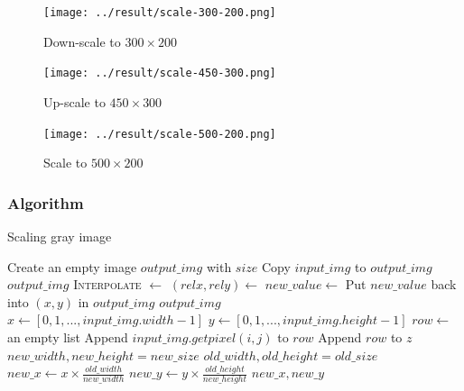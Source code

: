 \documentclass{article}
\begin{document}
\begin{figure}[H]
\centering
\texttt{[image: ../result/scale-300-200.png]}
\caption{Down-scale to $300 \times 200$}
\label{scale300}
\end{figure}

\begin{figure}[H]
\centering
\texttt{[image: ../result/scale-450-300.png]}
\caption{Up-scale to $450 \times 300$}
\label{scale450}
\end{figure}

\begin{figure}[H]
\centering
\texttt{[image: ../result/scale-500-200.png]}
\caption{Scale to $500 \times 200$}
\label{scale500}
\end{figure}

\subsubsection{Algorithm}
\label{sec:scalealgo}
\begin{algorithm}[H]
\centering
\caption{Scaling gray image}
\label{alg:scale}
  \begin{algorithmic}[1]
      \State Create an empty image $output\_img$ with $size$
        \State Copy $input\_img$ to $output\_img$
        \State \Return $output\_img$
	  \EndIf
      \State \textsc{Interpolate} $\gets$ 
      	\State $(relx, rely) \gets$ 
      	\State $new\_value \gets$ 
      	\State Put $new\_value$ back into $(x, y)$ in $output\_img$
      \EndFor
      \State \Return $output\_img$
    \EndFunction
    \\
      \State $x \gets [0, 1, ..., input\_img.width - 1]$
      \State $y \gets [0, 1, ..., input\_img.height - 1]$
      	  \State $row \gets$ an empty list
      	  \State Append $input\_img.getpixel(i, j)$ to $row$
      	\EndFor
      	\State Append $row$ to $z$
      \EndFor
      \State \Return {}
    \EndFunction
    \\
      \State $new\_width, new\_height = new\_size$
      \State $old\_width, old\_height = old\_size$
      \State $new\_x \gets x \times \frac{old\_width}{new\_width}$ 
      \State $new\_y \gets y \times \frac{old\_height}{new\_height}$ 
      \State \Return $new\_x, new\_y$
    \EndFunction
  \end{algorithmic}
\end{algorithm}
\end{document}
